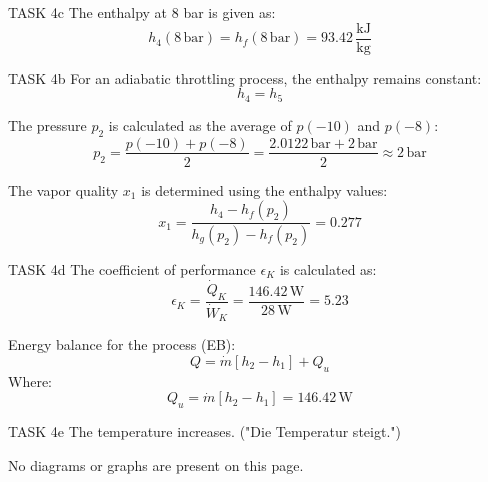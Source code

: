 TASK 4c  
The enthalpy at 8 bar is given as:  
\[
h_4(8 \, \text{bar}) = h_f(8 \, \text{bar}) = 93.42 \, \frac{\text{kJ}}{\text{kg}}
\]  

TASK 4b  
For an adiabatic throttling process, the enthalpy remains constant:  
\[
h_4 = h_5
\]  

The pressure \( p_2 \) is calculated as the average of \( p(-10) \) and \( p(-8) \):  
\[
p_2 = \frac{p(-10) + p(-8)}{2} = \frac{2.0122 \, \text{bar} + 2 \, \text{bar}}{2} \approx 2 \, \text{bar}
\]  

The vapor quality \( x_1 \) is determined using the enthalpy values:  
\[
x_1 = \frac{h_4 - h_f(p_2)}{h_g(p_2) - h_f(p_2)} = 0.277
\]  

TASK 4d  
The coefficient of performance \( \epsilon_K \) is calculated as:  
\[
\epsilon_K = \frac{\dot{Q}_K}{\dot{W}_K} = \frac{146.42 \, \text{W}}{28 \, \text{W}} = 5.23
\]  

Energy balance for the process (EB):  
\[
Q = \dot{m} \left[ h_2 - h_1 \right] + Q_u
\]  
Where:  
\[
Q_u = \dot{m} \left[ h_2 - h_1 \right] = 146.42 \, \text{W}
\]  

TASK 4e  
The temperature increases. ("Die Temperatur steigt.")  

No diagrams or graphs are present on this page.